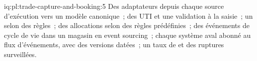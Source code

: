 \begin{solution}{iq:pl:trade-capture-and-booking:5}
Des adaptateurs depuis chaque source d'exécution vers un modèle canonique~; des UTI et une validation à la saisie~; un  selon des règles~; des allocations selon des règles prédéfinies~;
des événements de cycle de vie dans un magasin en event sourcing~; chaque système aval abonné au flux d'événements, avec des versions datées~; un taux de  et
des ruptures surveillées.
\end{solution}
